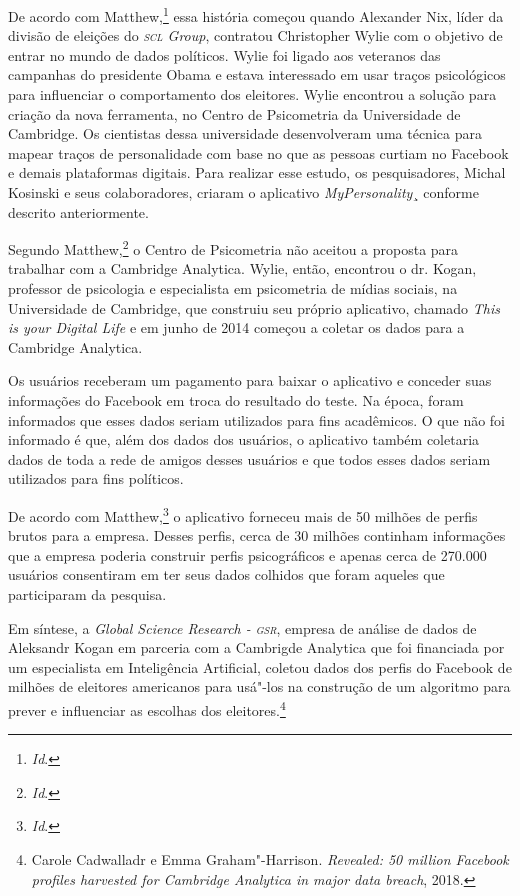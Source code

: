 De acordo com Matthew,\footnote{\textit{Id}.} essa história começou quando
Alexander Nix, líder da divisão de eleições do \emph{\textsc{scl} Group},
contratou Christopher Wylie com o objetivo de entrar no mundo de dados
políticos. Wylie foi ligado aos veteranos das campanhas do presidente
Obama e estava interessado em usar traços psicológicos para influenciar
o comportamento dos eleitores. Wylie encontrou a solução para criação da
nova ferramenta, no Centro de Psicometria da Universidade de Cambridge.
Os cientistas dessa universidade desenvolveram uma técnica para mapear
traços de personalidade com base no que as pessoas curtiam no Facebook e
demais plataformas digitais. Para realizar esse estudo, os
pesquisadores, Michal Kosinski e seus colaboradores, criaram o
aplicativo \emph{MyPersonality}¸ conforme descrito anteriormente.

Segundo Matthew,\footnote{\textit{Id}.} o Centro de Psicometria não aceitou a
proposta para trabalhar com a Cambridge Analytica. Wylie, então,
encontrou o dr. Kogan, professor de psicologia e especialista em
psicometria de mídias sociais, na Universidade de Cambridge, que
construiu seu próprio aplicativo, chamado \emph{This is your Digital
Life} e em junho de 2014 começou a coletar os dados para a Cambridge
Analytica.

Os usuários receberam um pagamento para baixar o aplicativo e conceder
suas informações do Facebook em troca do resultado do teste. Na época,
foram informados que esses dados seriam utilizados para fins acadêmicos.
O que não foi informado é que, além dos dados dos usuários, o aplicativo
também coletaria dados de toda a rede de amigos desses usuários e que
todos esses dados seriam utilizados para fins políticos.

De acordo com Matthew,\footnote{\textit{Id}.} o aplicativo forneceu mais de 50
milhões de perfis brutos para a empresa. Desses perfis, cerca de 30
milhões continham informações que a empresa poderia construir perfis
psicográficos e apenas cerca de 270.000 usuários consentiram em ter seus
dados colhidos que foram aqueles que participaram da pesquisa.

Em síntese, a \emph{Global Science Research - \textsc{gsr}}, empresa de análise
de dados de Aleksandr Kogan em parceria com a Cambrigde Analytica que
foi financiada por um especialista em Inteligência Artificial, coletou
dados dos perfis do Facebook de milhões de eleitores americanos para
usá"-los na construção de um algoritmo para prever e influenciar as
escolhas dos eleitores.\footnote{Carole Cadwalladr e Emma Graham"-Harrison. \emph{Revealed: 50 million Facebook profiles harvested for Cambridge Analytica in major data
breach}, 2018.}


